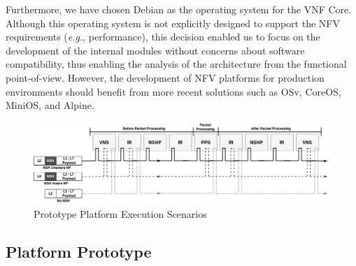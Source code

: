 \begin{itemize}
\end{itemize}

Furthermore, we have chosen Debian as the operating system for the VNF Core. Although this operating system is not explicitly designed to support the NFV requirements (\textit{e.g.}, performance), this decision enabled us to focus on the development of the internal modules without concerns about software compatibility, thus enabling the analysis of the architecture from the functional point-of-view. However, the development of NFV platforms for production environments should benefit from more recent solutions such as  OSv, CoreOS, MiniOS, and Alpine.


\begin{figure}[ht]
\centering
\includegraphics[width=.8\textwidth]{images/PlatformFlow.png}
\caption{Prototype Platform Execution Scenarios}
\label{FIG:PLATEXEC}
\end{figure}

\subsection{Platform Prototype}


